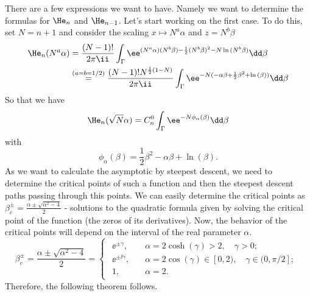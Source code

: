 {There are a few expressions we want to have. Namely we want to determine the formulas for $\He_{n}$ and  $\He_{n-1}$.  Let's start working on the first case.  To do this, set $N = n + 1$ and consider the scaling $x \mapsto N^a \alpha$ and $z = N^b \beta$ 
\begin{equation}
	\begin{split}
		\He_n(N^a \alpha) & = \frac{(N-1)!}{2\pi \ii} \int_{\Gamma} \ee^{(N^a \alpha)(N^b \beta)- \frac{1}{2}(N^b \beta)^2 - N\ln{(N^b \beta)}} \dd \beta \\
		& \stackrel{(a = b = 1/2)}{=}   \frac{(N-1)! N^{\frac{1}{2}\left(1-N\right)}}{2\pi \ii} \int_{\Gamma}  \ee^{-N(- \alpha \beta+ \frac{1}{2} \beta^2 + \ln{(\beta)})} \dd \beta
	\end{split}
\end{equation}
So that we have
\begin{equation}
	\He_n(\sqrt{N}\alpha) = C_n^0 \int_{\Gamma}  \ee^{-N \phi_\alpha(\beta) } \dd \beta
	\label{Equation: Hermite Integral}
\end{equation}
with 
\begin{equation}
	\phi_\alpha(\beta) = \frac{1}{2} \beta^2 - \alpha \beta + \ln{(\beta)}.
\end{equation}
As we want to calculate the asymptotic by steepest descent, we need to determine the critical points of such a function and then the steepest descent paths passing through this points. We can easily determine the critical points as $\beta_c^\pm = \frac{\alpha \pm \sqrt{{\alpha}^2 - 4}}{2}$ - solutions to the quadratic formula given by solving the critical point of the function (the zeros of its derivatives). Now, the behavior of the critical points will depend on the interval of the real parameter $\alpha$. 
\begin{equation}
	\beta_c^{\pm} = \frac{\alpha \pm \sqrt{\alpha^2 - 4}}{2} =
	\begin{cases}
		\begin{aligned}
			\ee^{\pm \gamma}, \quad & \alpha = 2 \cosh{(\gamma)} > 2, \quad \gamma > 0; \\
			\ee^{\pm \ii \gamma}, \quad & \alpha = 2 \cos{(\gamma)} \in [0,2), \quad \gamma \in (0,\pi/2]; \\
			1, \quad & \alpha = 2.
		\end{aligned}
	\end{cases}
\end{equation}
Therefore, the following theorem follows.

}
